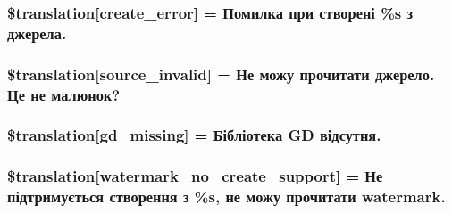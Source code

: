 \subsubsection[{\$translation}]{\setlength{\rightskip}{0pt plus 5cm}\$translation\mbox{[}\textquotesingle{}create\+\_\+error\textquotesingle{}\mbox{]} = \textquotesingle{}Помилка при створені \%s з джерела.\textquotesingle{}}\label{class_8upload_8uk___u_a_8php_a53013ce9255c4e1849098ddd9fdb2b3f}
\hypertarget{class_8upload_8uk___u_a_8php_a6ab0a660b457eaf2d3434b225449fdd6}{}
\subsubsection[{\$translation}]{\setlength{\rightskip}{0pt plus 5cm}\$translation\mbox{[}\textquotesingle{}source\+\_\+invalid\textquotesingle{}\mbox{]} = \textquotesingle{}Не можу прочитати джерело. Це не малюнок?\textquotesingle{}}\label{class_8upload_8uk___u_a_8php_a6ab0a660b457eaf2d3434b225449fdd6}
\hypertarget{class_8upload_8uk___u_a_8php_a7f3dfcc0db4bbc0f2e7210c439798e56}{}
\subsubsection[{\$translation}]{\setlength{\rightskip}{0pt plus 5cm}\$translation\mbox{[}\textquotesingle{}gd\+\_\+missing\textquotesingle{}\mbox{]} = \textquotesingle{}Бібліотека G\+D відсутня.\textquotesingle{}}\label{class_8upload_8uk___u_a_8php_a7f3dfcc0db4bbc0f2e7210c439798e56}
\hypertarget{class_8upload_8uk___u_a_8php_a82d5853430ab72dc1f9799ec36144cc6}{}
\subsubsection[{\$translation}]{\setlength{\rightskip}{0pt plus 5cm}\$translation\mbox{[}\textquotesingle{}watermark\+\_\+no\+\_\+create\+\_\+support\textquotesingle{}\mbox{]} = \textquotesingle{}Не підтримується створення з \%s, не можу прочитати watermark.\textquotesingle{}}\label{class_8upload_8uk___u_a_8php_a82d5853430ab72dc1f9799ec36144cc6}
\hypertarget{class_8upload_8uk___u_a_8php_aabca0b65dadbc6184415c16375f284ca}{}
